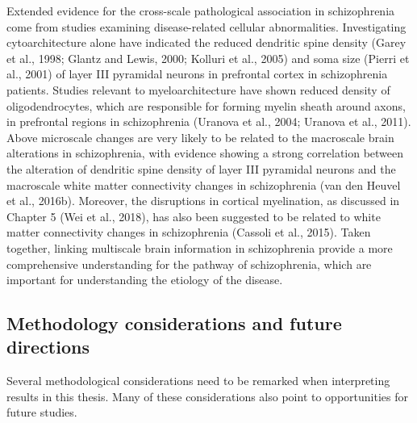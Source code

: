 \begin{refsection}
Extended evidence for the cross-scale pathological association in schizophrenia come from studies examining disease-related cellular abnormalities. Investigating cytoarchitecture alone have indicated the reduced dendritic spine density (Garey et al., 1998; Glantz and Lewis, 2000; Kolluri et al., 2005) and soma size (Pierri et al., 2001) of layer III pyramidal neurons in prefrontal cortex in schizophrenia patients. Studies relevant to myeloarchitecture have shown reduced density of oligodendrocytes, which are responsible for forming myelin sheath around axons, in prefrontal regions in schizophrenia (Uranova et al., 2004; Uranova et al., 2011). Above microscale changes are very likely to be related to the macroscale brain alterations in schizophrenia, with evidence showing a strong correlation between the alteration of dendritic spine density of layer III pyramidal neurons and the macroscale white matter connectivity changes in schizophrenia (van den Heuvel et al., 2016b). Moreover, the disruptions in cortical myelination, as discussed in Chapter 5 (Wei et al., 2018), has also been suggested to be related to white matter connectivity changes in schizophrenia (Cassoli et al., 2015). Taken together, linking multiscale brain information in schizophrenia provide a more comprehensive understanding for the pathway of schizophrenia, which are important for understanding the etiology of the disease.

\subsection*{Methodology considerations and future directions}
Several methodological considerations need to be remarked when interpreting results in this thesis. Many of these considerations also point to opportunities for future studies. 


\end{refsection}
